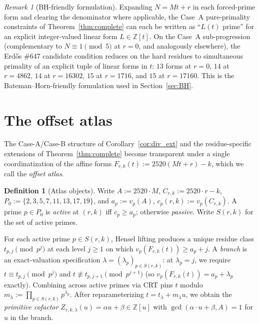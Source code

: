 \documentclass[11pt]{article}
\renewcommand{\_}{\origunderscore\allowbreak}
\theoremstyle{definition}
\newtheorem{definition}[theorem]{Definition}
\theoremstyle{remark}
\newtheorem{remark}[theorem]{Remark}
\begin{document}
\begin{remark}[BH-friendly formulation]\label{rem:bhfriendly}
Expanding $N=Mt+r$ in each forced-prime form and clearing the
denominator where applicable, the Case~A pure-primality constraints
of Theorem~\ref{thm:complete} can each be written as ``$L(t)$ prime''
for an explicit integer-valued linear form $L\in\mathbb{Z}[t]$.
On the Case~A sub-progression (complementary to $N\equiv 1\pmod 5$
at $r=0$, and analogously elsewhere), the Erd\H{o}s $\#647$
candidate condition reduces on the hard residues to simultaneous
primality of an explicit tuple of linear forms in $t$: $13$ forms
at $r=0$, $14$ at $r=4862$, $14$ at $r=16302$, $15$ at $r=1716$,
and $15$ at $r=17160$. This is the Bateman--Horn-friendly
formulation used in Section~\ref{sec:BH}.
\end{remark}

\section{The offset atlas}\label{sec:atlas}

The Case-A/Case-B structure of Corollary~\ref{cor:div_ext} and the
residue-specific extensions of Theorem~\ref{thm:complete} become
transparent under a single coordinatization of the affine forms
$F_{r,k}(t):=2520(Mt+r)-k$, which we call the \emph{offset atlas}.

\begin{definition}[Atlas objects]
Write $A:=2520\cdot M$, $C_{r,k}:=2520\cdot r-k$, $P_0:=\{2,3,5,7,11,13,17,19\}$,
and $a_p:=v_p(A)$, $c_p(r,k):=v_p(C_{r,k})$. A prime $p\in P_0$ is
\emph{active} at $(r,k)$ iff $c_p\ge a_p$; otherwise \emph{passive}.
Write $S(r,k)$ for the set of active primes.
\end{definition}

For each active prime $p\in S(r,k)$, Hensel lifting produces a
unique residue class $t_{p,j}\pmod{p^j}$ at each level $j\ge 1$ on
which $v_p(F_{r,k}(t))\ge a_p+j$. A \emph{branch} is an exact-valuation
specification $\lambda=(\lambda_p)_{p\in S(r,k)}$: at $\lambda_p=j$,
we require $t\equiv t_{p,j}\pmod{p^j}$ and $t\not\equiv t_{p,j+1}\pmod{p^{j+1}}$
(so $v_p(F_{r,k}(t))=a_p+\lambda_p$ exactly). Combining across active
primes via CRT pins $t$ modulo $m_\lambda:=\prod_{p\in S(r,k)}p^{\lambda_p}$.
After reparameterizing $t=t_\lambda+m_\lambda u$, we obtain the
\emph{primitive cofactor} $Z_{r,k,\lambda}(u)=\alpha u+\beta\in\mathbb{Z}[u]$
with $\gcd(\alpha\cdot u+\beta,A)=1$ for $u$ in the branch.
\end{document}
